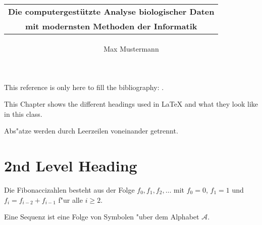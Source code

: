\documentclass[twoside,a4paper,ger]{master}
\newcommand{\Alphabet}{\mathcal{A}\xspace}
\begin{document}

\author{Max Mustermann}
\title{
       \begin{tabular}{c}
       \textbf{Die computergest{\"u}tzte Analyse biologischer Daten}\\[3mm]
       \textbf{mit modernsten Methoden der Informatik}
       \end{tabular}}
\Maketitle

\small
\lipsum[1] %

This reference is only here to fill the bibliography: \cite{articleex}.
\normalsize

\setcounter{tocdepth}{1}
\tableofcontents




This Chapter shows the different headings used in
\LaTeX{} and what they look like in this class.

Abs"atze werden durch Leerzeilen voneinander getrennt.

\lipsum[2]

\section{2nd Level Heading}
\lipsum[3]

\begin{Definition}[Fibonaccizahlen]
Die Fibonaccizahlen besteht aus der Folge \(f_{0},f_{1},f_{2},\ldots\) mit
\(f_{0}=0\), \(f_{1}=1\) und \(f_{i}=f_{i-2}+f_{i-1}\) f"ur alle \(i\geq 2\).
\end{Definition}

\lipsum[4]

\begin{Definition}
Eine Sequenz ist eine Folge von Symbolen "uber dem Alphabet \(\Alphabet\).
\end{Definition}
\end{document}
